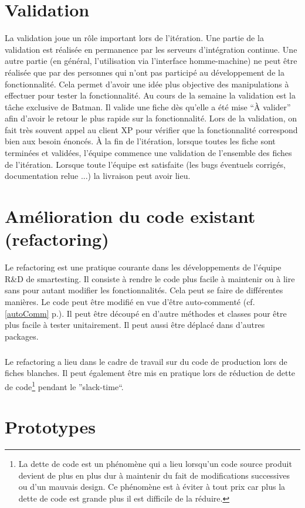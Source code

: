 \section{Validation}
La validation joue un rôle important lors de l'itération. Une partie de la validation est réalisée en permanence par les serveurs d'intégration continue. Une autre partie (en général, l'utilisation via l'interface homme-machine) ne peut être réalisée que par des personnes qui n'ont pas participé au développement de la fonctionnalité. Cela permet d'avoir une idée plus objective des manipulations à effectuer pour tester la fonctionnalité. Au cours de la semaine la validation est la tâche exclusive de Batman. Il valide une fiche dès qu'elle a été mise ``À valider'' afin d'avoir le retour le plus rapide sur la fonctionnalité. Lors de la validation, on fait très souvent appel au client XP pour vérifier que la fonctionnalité correspond bien aux besoin énoncés. À la fin de l'itération, lorsque toutes les fiche sont terminées et validées, l'équipe commence une validation de l'ensemble des fiches de l'itération. Lorsque toute l'équipe est satisfaite (les bugs éventuels corrigés, documentation relue ...) la livraison peut avoir lieu.

\section{Amélioration du code existant (refactoring)}
Le refactoring est une pratique courante dans les développements de l'équipe R\&D de smartesting. Il consiste à rendre le code plus facile à maintenir ou à lire sans pour autant modifier les fonctionnalités. Cela peut se faire de différentes manières. Le code peut être modifié en vue d'être auto-commenté (cf. \ref{autoComm} p.\pageref{autoComm}). Il peut être découpé en d'autre méthodes et classes pour être plus facile à tester unitairement. Il peut aussi être déplacé dans d'autres packages.

\subparagraph*{}
Le refactoring a lieu dans le cadre de travail sur du code de production lors de fiches blanches. Il peut également être mis en pratique lors de réduction de dette de code\footnote{La dette de code est un phénomène qui a lieu lorsqu'un code source produit devient de plus en plus dur à maintenir du fait de modifications successives ou d'un mauvais design. Ce phénomène est à éviter à tout prix car plus la dette de code est grande plus il est difficile de la réduire.} pendant le ''slack-time``.

\section{Prototypes}

